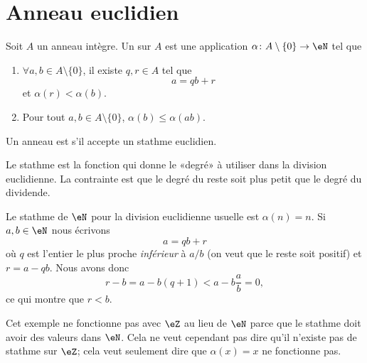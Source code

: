 \section{Anneau euclidien}

\begin{definition} \label{DefAXitWRL}
    Soit \( A\) un anneau intègre. Un  sur \( A\) est une application \( \alpha\colon A\setminus\{ 0 \}\to \eN\) tel que
    \begin{enumerate}
        \item       \label{ITEMooLVJAooLpjgEz}
            \( \forall a,b\in A\setminus\{ 0 \}\), il existe \( q,r\in A\) tel que
            \begin{equation}
                a=qb+r
            \end{equation}
            et \( \alpha(r)<\alpha(b)\).
        \item
            Pour tout \( a,b\in A\setminus\{ 0 \}\), \( \alpha(b)\leq \alpha(ab)\).
    \end{enumerate}
    Un anneau est  s'il accepte un stathme euclidien.
\end{definition}
Le stathme est la fonction qui donne le «degré» à utiliser dans la division euclidienne. La contrainte est que le degré du reste soit plus petit que le degré du dividende.

\begin{example} \label{ExwqlCwvV}
    Le stathme de \( \eN\) pour la division euclidienne usuelle est \( \alpha(n)=n\). Si \( a,b\in \eN\) nous écrivons
    \begin{equation}
        a=qb+r
    \end{equation}
    où \( q\) est l'entier le plus proche \emph{inférieur} à \( a/b\) (on veut que le reste soit positif) et \( r=a-qb\). Nous avons donc
    \begin{equation}
        r-b=a-b(q+1)<a-b\frac{ a }{ b }=0,
    \end{equation}
    ce qui montre que \( r<b\).
\end{example}

Cet exemple ne fonctionne pas avec \( \eZ\) au lieu de \( \eN\) parce que le stathme doit avoir des valeurs dans \( \eN\). Cela ne veut cependant pas dire qu'il n'existe pas de stathme sur \( \eZ\); cela veut seulement dire que \( \alpha(x)=x\) ne fonctionne pas. 


